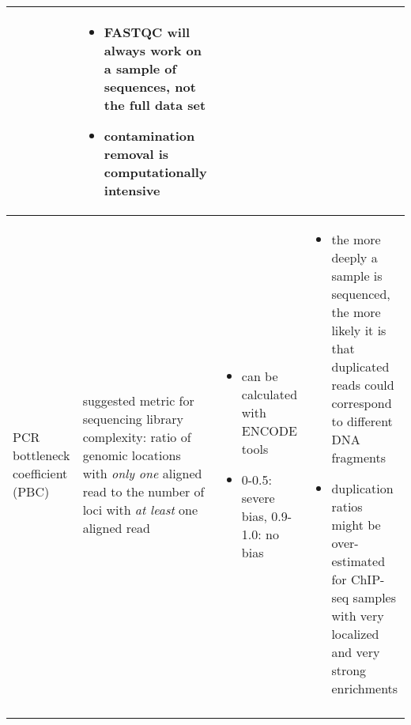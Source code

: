 \begin{landscape}
\begin{singlespacing}
\begin{small}
\begin{longtable}{>{\textsf\bgroup\raggedleft\arraybackslash}p{2cm}<{\egroup} >{\textsf\bgroup}p{6.5cm}<{\egroup} >{\textsf\bgroup}p{6.1cm}<{\egroup}>{\textsf\bgroup}p{6.7cm}<{\egroup}}
			& \begin{minipage}{6.7cm}
					\begin{itemize}[noitemsep,leftmargin=*]
						\item FASTQC will always work on a sample of sequences, not the full data set
						\item contamination removal is computationally intensive
			\end{itemize}
			\end{minipage}
\tabularnewline  \midrule
\begin{minipage}{2cm}
				\raggedright PCR bot\-tle\-neck co\-ef\-fi\-cient (PBC)
\end{minipage}
			&	\begin{minipage}{6.5cm}
				suggested metric for sequencing library complexity: ratio of genomic locations with \textit{only one} aligned read to the number of loci with \textit{at least} one aligned read \citep{ENCODEMetrics}
			\end{minipage}
			& \begin{minipage}{6.1cm}
					\begin{itemize}[noitemsep,leftmargin=*]
						\item can be calculated with ENCODE tools \citep{ENCODETools}
						\item 0-0.5: severe bias, 0.9-1.0: no bias
					\end{itemize}
			\end{minipage}
			& \begin{minipage}{6.7cm}
                \vskip 6pt
					\begin{itemize}[noitemsep,leftmargin=*]
						\item the more deeply a sample is sequenced, the more likely it is that duplicated reads could correspond to different DNA fragments \citep{Zhang2008, Landt2012, Yan2014}
						\item duplication ratios might be over-estimated for ChIP-seq samples with very localized and very strong enrichments \citep{Chen2012} 
			\end{itemize}
            \vskip 4pt
			\end{minipage}
\tabularnewline  \midrule
\begin{minipage}{2cm}

\end{minipage}
\end{longtable}
\end{small}
\end{singlespacing}
\end{landscape}
